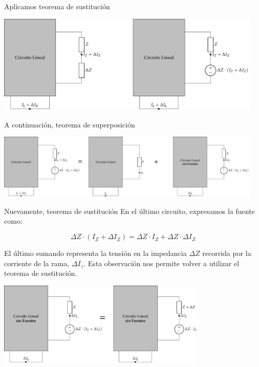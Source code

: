 \documentclass[aspectratio=169, usenames,svgnames,dvipsnames]{beamer}
\begin{document}
\begin{frame}[label={sec:orgbab303f}]{Aplicamos teorema de sustitución}
\begin{center}
\includegraphics[width=0.95\textwidth]{../figs/TeoremaCompensacion1.pdf}
\end{center}
\end{frame}

\begin{frame}[label={sec:org215620b}]{A continuación, teorema de superposición}
\begin{center}
\includegraphics[width=0.95\textwidth]{../figs/TeoremaCompensacion2.pdf}
\end{center}
\end{frame}

\begin{frame}[label={sec:org1c2c5e2}]{Nuevamente, teorema de sustitución}
En el último circuito, expresamos la fuente como:

\[
  \Delta Z \cdot (I_Z + \Delta I_Z) = \Delta Z \cdot I_Z + \Delta Z \cdot \Delta I_Z
\]

El último sumando representa la tensión en la impedancia \(\Delta Z\) recorrida por la corriente de la rama, \(\Delta I_z\). Esta observación nos permite volver a utilizar el teorema de sustitución.


\begin{center}
\includegraphics[width=0.75\textwidth]{../figs/TeoremaCompensacion3.pdf}
\end{center}
\end{frame}
\end{document}
